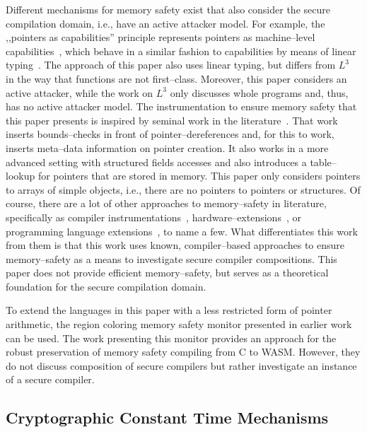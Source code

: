 \documentclass[utf8,acmsmall,review,screen,dvipsnames]{acmart}
\begin{document}
Different mechanisms for memory safety exist that also consider the secure compilation domain, i.e., have an active attacker model.
For example, the ,,pointers as capabilities'' principle represents pointers as machine--level capabilities~\cite{korashy2021capableptrs}, which behave in a similar fashion to capabilities by means of linear typing~\cite{morrisett2005L3}.
The approach of this paper also uses linear typing, but differs from $L^{3}$~\cite{morrisett2005L3} in the way that functions are not first--class.
Moreover, this paper considers an active attacker, while the work on $L^{3}$ only discusses whole programs and, thus, has no active attacker model.
The instrumentation to ensure memory safety that this paper presents is inspired by seminal work in the literature~\cite{nagarakatte2009soft}.
That work inserts bounds--checks in front of pointer--dereferences and, for this to work, inserts meta--data information on pointer creation.
It also works in a more advanced setting with structured fields accesses and also introduces a table--lookup for pointers that are stored in memory.
This paper only considers pointers to arrays of simple objects, i.e., there are no pointers to pointers or structures.
Of course, there are a lot of other approaches to memory--safety in literature, specifically as compiler instrumentations~\cite{akritidis2009baggy,younan2010paricheck,jung2021pico,shankaranarayana2023tailcheck,dhumbumroong2020boundwarden,nam2019framer,zhou2023fatptrs}, hardware--extensions~\cite{kwon2013lowfat,saileshwar2022heapcheck,chen2023flexpointer,kim2023whistle}, or programming language extensions~\cite{elliott2018checkedc,li2022formalcheckedc,jim2002cyclone,elliott2015guilt,west2005cuckoo,weis2019fyr,benoit2019uniqueness}, to name a few.
What differentiates this work from them is that this work uses known, compiler--based approaches to ensure memory--safety as a means to investigate secure compiler compositions.
This paper does not provide efficient memory--safety, but serves as a theoretical foundation for the secure compilation domain.

To extend the languages in this paper with a less restricted form of pointer arithmetic, the region coloring memory safety monitor presented in earlier work~\cite{michael2023mswasm} can be used.
The work presenting this monitor provides an approach for the robust preservation of memory safety compiling from C to WASM.
However, they do not discuss composition of secure compilers but rather investigate an instance of a secure compiler.

\subsection{Cryptographic Constant Time Mechanisms}\label{subsec:relw:cctmechs}
\end{document}
